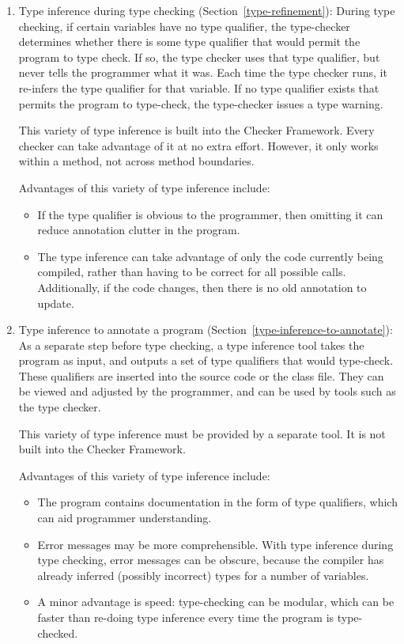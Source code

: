 \begin{enumerate}
\item
  Type inference during type checking (Section~\ref{type-refinement}):
  During type checking, if certain variables have no type qualifier, the
  type-checker determines whether there is some type qualifier that would
  permit the program to type check.  If so, the type checker uses that type
  qualifier, but never tells the programmer what it was.  Each time the
  type checker runs, it re-infers the type qualifier for that variable.  If
  no type qualifier exists that permits the program to type-check, the
  type-checker issues a type warning.

  This variety of type inference is built into the Checker Framework.  Every
  checker can take advantage of it at no extra effort.  However, it only
  works within a method, not across method boundaries.

  Advantages of this variety of type inference include:
  \begin{itemize}
  \item
    If the type qualifier is obvious to the programmer, then omitting it
    can reduce annotation clutter in the program.
  \item
    The type inference can take advantage of only the code currently being
    compiled, rather than having to be correct for all possible calls.
    Additionally, if the code changes, then there is no old annotation to
    update.
  \end{itemize}


\item
  Type inference to annotate a program (Section~\ref{type-inference-to-annotate}):
  As a separate step before type checking, a type inference tool takes the
  program as input, and outputs a set of type qualifiers that would
  type-check.  These qualifiers are inserted into the source code or the
  class file.  They can be viewed and adjusted by the programmer, and can
  be used by tools such as the type checker.

  This variety of type inference must be provided by a separate tool.  It
  is not built into the Checker Framework.

  Advantages of this variety of type inference include:
  \begin{itemize}
  \item
    The program contains documentation in the form of type qualifiers,
    which can aid programmer understanding.
  \item
    Error messages may be more comprehensible.  With type inference
    during type checking, error messages can be obscure, because the
    compiler has already inferred (possibly incorrect) types for a number
    of variables.
  \item
    A minor advantage is speed:  type-checking can be modular, which can be
    faster than re-doing type inference every time the
    program is type-checked.
  \end{itemize}

\end{enumerate}

